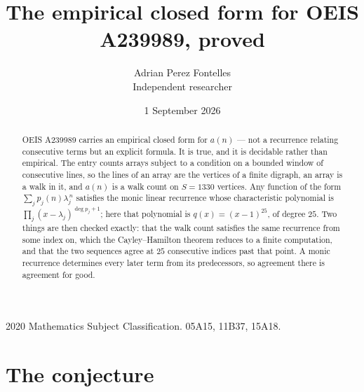 \documentclass[11pt,a4paper]{article}
\title{The empirical closed form for OEIS A239989, proved}
\author{Adrian Perez Fontelles\\ \small Independent researcher}
\date{1 September 2026}
\theoremstyle{plain}
\theoremstyle{definition}
\begin{document}
\maketitle

\begin{abstract}
OEIS A239989 carries an empirical closed form for $a(n)$ --- not a recurrence relating
consecutive terms but an explicit formula. It is true, and it is decidable rather than
empirical. The entry counts arrays subject to a condition on a bounded window of consecutive lines, so the lines of an array are the
vertices of a finite digraph, an array is a walk in it, and $a(n)$ is a walk count on
$S=1330$ vertices. Any function of the form $\sum_j p_j(n)\lambda_j^{\,n}$ satisfies the
monic linear recurrence whose characteristic polynomial is
$\prod_j(x-\lambda_j)^{\deg p_j+1}$; here that polynomial is $q(x)=(x-1)^{25}$, of degree
$25$. Two things are then checked exactly: that the walk count satisfies the same
recurrence from some index on, which the Cayley--Hamilton theorem reduces to a finite
computation, and that the two sequences agree at $25$ consecutive indices past that
point. A monic recurrence determines every later term from its predecessors, so agreement
there is agreement for good.
\end{abstract}

\noindent\small 2020 Mathematics Subject Classification. 05A15, 11B37, 15A18.\normalsize

\section{The conjecture}
\end{document}

